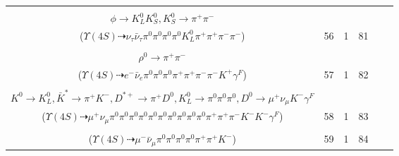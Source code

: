 \documentclass[landscape]{article}
\newcounter{rownumbers}
\newcommand\rn{\stepcounter{rownumbers}\arabic{rownumbers}}
\newcommand{\EOLP}{\\ \hline} %
\newcommand{\topoTags}[1]{#1} %
\begin{document}
\begin{longtable}{clcccc}
\rn & \makecell[l]{ $ 
\Upsilon(4S) \rightarrow B^{0} \bar{B}^{0} ,
B^{0} \rightarrow \pi^{0} \bar{D}^{0} ,
\bar{B}^{0} \rightarrow \tau^{-} \bar{\nu}_{\tau} D^{+} ,
\bar{D}^{0} \rightarrow \pi^{0} \pi^{0} ,
\tau^{-} \rightarrow \nu_{\tau} \pi^{0} \pi^{-} ,
D^{+} \rightarrow \pi^{+} \phi ,
$ \\ $
\phi \rightarrow K_{L}^{0} K_{S}^{0} ,
K_{S}^{0} \rightarrow \pi^{+} \pi^{-} 
$ \\ ($
\Upsilon(4S) \dashrightarrow \nu_{\tau} \bar{\nu}_{\tau} \pi^{0} \pi^{0} \pi^{0} \pi^{0} K_{L}^{0} \pi^{+} \pi^{+} \pi^{-} \pi^{-} 
$) } & \topoTags{56 & }1 & 81 \EOLP

\rn & \makecell[l]{ $ 
\Upsilon(4S) \rightarrow B^{0} \bar{B}^{0} ,
B^{0} \rightarrow D^{-} a_{1}^{+} ,
\bar{B}^{0} \rightarrow \pi^{0} D^{0} ,
D^{-} \rightarrow e^{-} \bar{\nu}_{e} \pi^{-} K^{+} \gamma^{F} ,
a_{1}^{+} \rightarrow \rho^{0} \pi^{+} ,
D^{0} \rightarrow \pi^{0} \pi^{0} ,
$ \\ $
\rho^{0} \rightarrow \pi^{+} \pi^{-} 
$ \\ ($
\Upsilon(4S) \dashrightarrow e^{-} \bar{\nu}_{e} \pi^{0} \pi^{0} \pi^{0} \pi^{+} \pi^{+} \pi^{-} \pi^{-} K^{+} \gamma^{F} 
$) } & \topoTags{57 & }1 & 82 \EOLP

\rn & \makecell[l]{ $ 
\Upsilon(4S) \rightarrow B^{0} \bar{B}^{0} ,
B^{0} \rightarrow \pi^{0} \bar{D}^{0} ,
\bar{B}^{0} \rightarrow \rho^{-} \eta K^{0} \bar{K}^{*} D^{*+} ,
\bar{D}^{0} \rightarrow \pi^{0} \pi^{0} ,
\rho^{-} \rightarrow \pi^{0} \pi^{-} ,
\eta \rightarrow \pi^{0} \pi^{0} \pi^{0} ,
$ \\ $
K^{0} \rightarrow K_{L}^{0} ,
\bar{K}^{*} \rightarrow \pi^{+} K^{-} ,
D^{*+} \rightarrow \pi^{+} D^{0} ,
K_{L}^{0} \rightarrow \pi^{0} \pi^{0} \pi^{0} ,
D^{0} \rightarrow \mu^{+} \nu_{\mu} K^{-} \gamma^{F} 
$ \\ ($
\Upsilon(4S) \dashrightarrow \mu^{+} \nu_{\mu} \pi^{0} \pi^{0} \pi^{0} \pi^{0} \pi^{0} \pi^{0} \pi^{0} \pi^{0} \pi^{0} \pi^{0} \pi^{+} \pi^{+} \pi^{-} K^{-} K^{-} \gamma^{F} 
$) } & \topoTags{58 & }1 & 83 \EOLP

\rn & \makecell[l]{ $ 
\Upsilon(4S) \rightarrow B^{0} \bar{B}^{0} ,
B^{0} \rightarrow \pi^{0} \bar{D}^{0} ,
\bar{B}^{0} \rightarrow \mu^{-} \bar{\nu}_{\mu} D^{+} ,
\bar{D}^{0} \rightarrow \pi^{0} \pi^{0} ,
D^{+} \rightarrow \pi^{0} \pi^{+} \bar{K}^{*} ,
\bar{K}^{*} \rightarrow \pi^{+} K^{-} 
$ \\ ($
\Upsilon(4S) \dashrightarrow \mu^{-} \bar{\nu}_{\mu} \pi^{0} \pi^{0} \pi^{0} \pi^{0} \pi^{+} \pi^{+} K^{-} 
$) } & \topoTags{59 & }1 & 84 \EOLP


\end{longtable}
\end{document}
